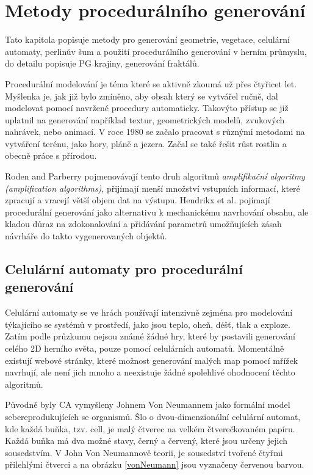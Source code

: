 \newpage

\chapter{Metody procedurálního generování}
\label{procedural}
Tato kapitola popisuje metody pro generování geometrie, vegetace, celulární automaty, perlinův šum a použití procedurálního generování v herním průmyslu, do detailu popisuje PG krajiny, generování fraktálů.

Procedurální modelování je téma které se aktivně zkoumá už přes čtyřicet let. Myšlenka je, jak již bylo zmíněno, aby obsah který se vytvářel ručně, dal modelovat pomocí navržené procedury automaticky. Takovýto přístup se již uplatnil na generování například textur, geometrických modelů, zvukových nahrávek, nebo animací. V roce 1980 se začalo pracovat s různými metodami na vytváření terénu, jako hory, pláně a jezera. Začal se také řešit růst rostlin a obecně práce s přírodou. \cite{inproceedings}

Roden and Parberry \cite{FromArtistry} pojmenovávají tento druh algoritmů \textit{amplifikační algoritmy (amplification algorithms)}, přijímají menší množství vstupních informací, které zpracují a vracejí větší objem dat na výstupu. Hendrikx et al. \cite{Hendrikx} pojímají procedurální generování jako alternativu k mechanickému navrhování obsahu, ale kladou důraz na zdokonalování a přidávání parametrů umožňujících zásah návrháře do takto vygenerovaných objektů.

\section{Celulární automaty pro procedurální generování}
\label{celular}
Celulární automaty se ve hrách používají intenzivně zejména pro modelování týkajícího se systémů v prostředí, jako jsou teplo, oheň, déšť, tlak a exploze. Zatím podle průzkumu nejsou známé žádné hry, které by postavili generování celého 2D herního světa, pouze pomocí celulárních automatů. Momentálně existují webové stránky, které možnost generování malých map pomocí mřížek navrhují, ale není jich mnoho a neexistuje žádné spolehlivé ohodnocení těchto algoritmů. \cite{articleCellular}

Původně byly CA vymyšleny Johnem Von Neumannem jako formální model sebereprodukujících se organismů. Šlo o dvou-dimenzionální celulární automat, kde každá buňka, tzv. cell, je malý čtverec na velkém čtverečkovaném papíru. Každá buňka má dva možné stavy, černý a červený, které jsou určeny jejich sousedstvím. V John Von Neumannově teorii, je sousedství tvořené čtyřmi přilehlými čtverci a na obrázku \ref{vonNeumann} jsou vyznačeny červenou barvou. \cite{Gong2017}

